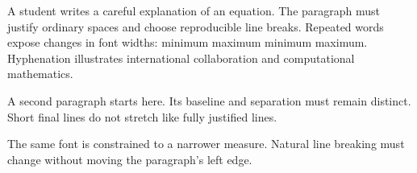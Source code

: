 \documentclass[12pt,letterpaper]{article}
\begin{document}
\begin{minipage}{240pt}
A student writes a careful explanation of an equation. The paragraph must justify ordinary spaces and choose reproducible line breaks. Repeated words expose changes in font widths: minimum maximum minimum maximum. Hyphenation illustrates international collaboration and computational mathematics.

A second paragraph starts here. Its baseline and separation must remain distinct. Short final lines do not stretch like fully justified lines.
\end{minipage}

\begin{minipage}{180pt}
The same font is constrained to a narrower measure. Natural line breaking must change without moving the paragraph's left edge.
\end{minipage}
\end{document}

